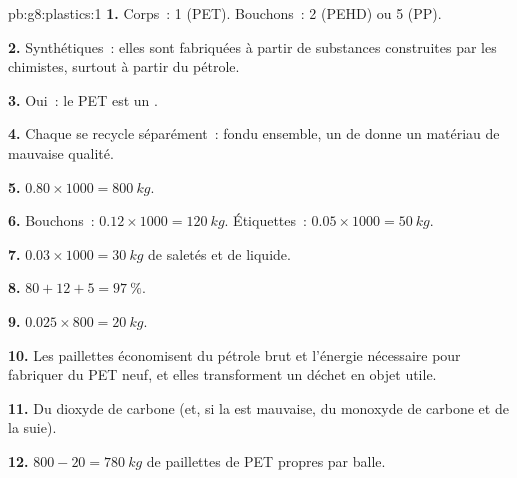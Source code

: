 \begin{solution}{pb:g8:plastics:1}
\textbf{1.} Corps~: 1 (PET). Bouchons~: 2 (PEHD) ou 5 (PP).

\textbf{2.} Synthétiques~: elles sont fabriquées à partir de substances
construites par les chimistes, surtout à partir du pétrole.

\textbf{3.} Oui~: le PET est un .

\textbf{4.} Chaque  se recycle séparément~: fondu
ensemble, un  de  donne un matériau de
mauvaise qualité.

\textbf{5.} $0.80 \times 1000 = \qty{800}{kg}$.

\textbf{6.} Bouchons~: $0.12 \times 1000 = \qty{120}{kg}$. Étiquettes~: $0.05
\times 1000 = \qty{50}{kg}$.

\textbf{7.} $0.03 \times 1000 = \qty{30}{kg}$ de saletés et de liquide.

\textbf{8.} $80 + 12 + 5 = \qty{97}{\percent}$.

\textbf{9.} $0.025 \times 800 = \qty{20}{kg}$.

\textbf{10.} Les paillettes économisent du pétrole brut et l'énergie
nécessaire pour fabriquer du PET neuf, et elles transforment un déchet
en objet utile.

\textbf{11.} Du dioxyde de carbone (et, si la  est mauvaise, du
monoxyde de carbone et de la suie).

\textbf{12.} $800 - 20 = \qty{780}{kg}$ de paillettes de PET propres par
balle.
\end{solution}

